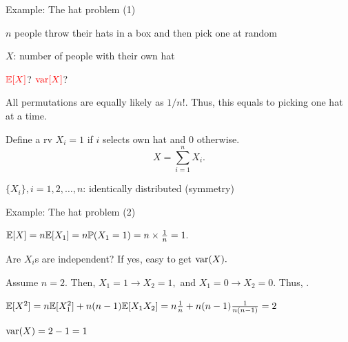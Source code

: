 \documentclass[fleqn,aspectratio=169]{beamer}
\begin{document}
\begin{frame}{Example: The hat problem (1)}

\plitemsep 0.1in
\bci 
\item<1-> $n$ people throw their hats in a box and then pick one at random

\item<1-> $X$: number of people with their own hat

\item<2->  ${\color{red} \mathbb{E}[ X ]}$? ${\color{red} \text{var}[ X ]}$?

\item<3-> All permutations are equally likely as $1/n!.$ Thus, this equals to picking one hat at a time.

\item<4->  Define a rv $X_i=1$ if $i$ selects own hat and $0$ otherwise. 
$$X = \sum_{i=1}^n X_i.$$

\item<5-> $\{X_i\}, i=1, 2, \ldots, n$: identically distributed (symmetry)



\eci
\end{frame}

\begin{frame}{Example: The hat problem (2)}

\plitemsep 0.05in
\bci 
\item<1-> $\mathbb{E}[ X ] = n \mathbb{E}[ X_1 ] = n \mathbb{P}( X_1 =1 ) = n\times \frac{1}{n} = 1.$

\item<2->  Are $X_i$s are independent? If yes, easy to get $\text{var}( X ).$

\item<3-> Assume $n=2.$ Then, $X_1=1 \rightarrow X_2=1,$ and $X_1=0 \rightarrow X_2=0.$ Thus, .

\item<7-> $\mathbb{E}[ X^2 ] = n \mathbb{E}[ X_1^2 ] + n(n-1) \mathbb{E}[ X_1 X_2 ] = n\frac{1}{n} + n(n-1)\frac{1}{n(n-1)} = 2$

\item<8-> $\text{var}( X ) = 2-1 =1$
\eci
\end{frame}
\end{document}
